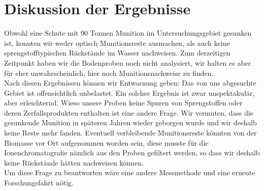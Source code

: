 \section{Diskussion der Ergebnisse}
Obwohl eine Schute mit 90 Tonnen Munition im Untersuchungsgebiet gesunken ist, konnten wir weder optisch Munitionsreste ausmachen, als auch keine sprengstofftypischen Rückstände im Wasser nachweisen. Zum derzeitigen Zeitpunkt haben wir die Bodenproben noch nicht analysiert, wir halten es aber für eher unwahrscheinlich, hier noch Munitionsnachweise zu finden.
\\
Nach diesen Ergebnissen können wir Entwarnung geben: Das von uns abgesuchte Gebiet ist offensichtlich unbelastet. Ein solches Ergebnis ist zwar unspektakulär, aber erleichternd. Wieso 
unsere Proben keine Spuren von Sprengstoffen oder deren Zerfallsprodukten 
enthalten ist eine andere Frage. Wir vermuten, dass die gesunkende Munition in späteren Jahren wieder geborgen wurde und wir deshalb keine Reste mehr fanden.
Eventuell verbleibende Munitionsreste könnten von der Biomasse vor Ort aufgenommen worden sein, diese musste für die Ionenchromatografie nämlich aus den Proben gefiltert werden, so dass wir deshalb keine Rückstände hätten nachweisen können. \\ 
Um diese Frage zu beantworten wäre eine andere Messmethode und eine erneute Forschungsfahrt nötig.